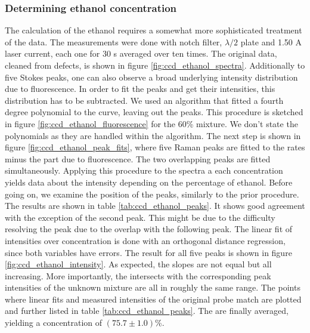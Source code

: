 \subsubsection{Determining ethanol concentration}
The calculation of the ethanol requires a somewhat more sophisticated treatment of the data. 
The measurements were done with notch filter, $\lambda / 2$ plate and 1.50 A laser current, 
each one for 30 s averaged over ten times. The original data, cleaned from defects, is shown 
in figure \ref{fig:ccd_ethanol_spectra}. Additionally to five Stokes peaks, one can also observe 
a broad underlying intensity distribution due to fluorescence. In order to fit the peaks and get 
their intensities, this distribution has to be subtracted. We used an algorithm that fitted a 
fourth degree polynomial to the curve, leaving out the peaks. This procedure is sketched in 
figure \ref{fig:ccd_ethanol_fluorescence} for the 60\% mixture. We don't state the polynomials as they 
are handled within the algorithm. 
The next step is shown in figure \ref{fig:ccd_ethanol_peak_fits}, where five Raman 
peaks are fitted to the rates minus the part due to fluorescence. The two overlapping peaks are fitted
simultaneously. Applying this procedure to 
the spectra a each concentration yields data about the intensity depending on the percentage of ethanol. 
Before going on, we examine the position of the peaks, similarly to the prior procedure. 
The results are shown in table \ref{tab:ccd_ethanol_peaks}. It shows good agreement with the exception 
of the second peak. This might be due to the difficulty resolving the peak due to the overlap with the 
following peak.
The linear fit of intensities over concentration is done with an orthogonal distance regression, 
since both variables have errors. The result for all five peaks is shown in figure 
\ref{fig:ccd_ethanol_intensity}. As expected, the slopes are not equal but all increasing. 
More importantly, the intersects with the corresponding peak intensities of the unknown mixture 
are all in roughly the same range. The points where linear fits and measured intensities of the original 
probe match are plotted and further listed in table \ref{tab:ccd_ethanol_peaks}. The are finally 
averaged, yielding a concentration of $(75.7 \pm 1.0)$\%.  

